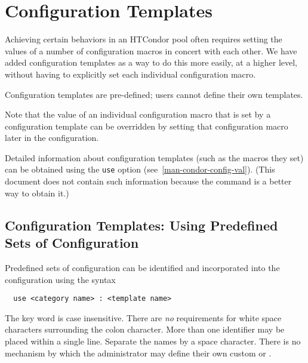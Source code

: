 \section{\label{sec:Configuring-HTCondor-Templates}Configuration Templates}


Achieving certain behaviors in an HTCondor pool often requires
setting the values of a number of configuration macros in concert
with each other.  We have added configuration templates as a way
to do this more easily, at a higher level, without having to
explicitly set each individual configuration macro.

Configuration templates are pre-defined; users cannot define their
own templates.

Note that the value of an individual configuration macro that is
set by a configuration template can be overridden by setting that
configuration macro later in the configuration.

Detailed information about configuration templates (such as the
macros they set) can be obtained using the 
\texttt{use} option (see~\ref{man-condor-config-val}).
(This document does not contain such information because the
 command is a better way to obtain it.)

\subsection{\label{sec:Config-Templates}Configuration Templates: Using
Predefined Sets of Configuration}
Predefined sets of configuration can be identified and incorporated
into the configuration using the syntax
\begin{verbatim}
  use <category name> : <template name> 
\end{verbatim}

The  key word is case insensitive.
There are \emph{no} requirements for white space characters surrounding
the colon character.
More than one  identifier may be placed within
a single  line. 
Separate the names by a space character. 
There is no mechanism by which the administrator may define their
own custom  or .


